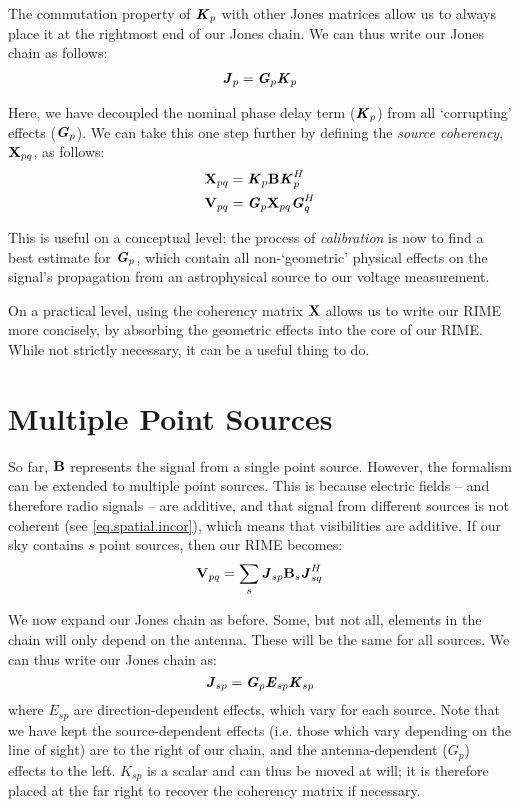 \pg
The commutation property of $\textbf{\emph{K}}_p$ with other Jones matrices allow us to always place it at the rightmost end of our Jones chain. We can thus write our Jones chain as follows:
\begin{align}
\textbf{\emph{J}}_p  &= \textbf{\emph{G}}_p \textbf{\emph{K}}_p\\
\end{align}

\pg
Here, we have decoupled the nominal phase delay term ($\textbf{\emph{K}}_p$) from all `corrupting' effects ($\textbf{\emph{G}}_p$). We can take this one step further by defining the \emph{source coherency}, $\textbf{X}_{pq}$, as follows:
\begin{align}\label{eq.def.coherency}
\textbf{X}_{pq} &= \textbf{\emph{K}}_p \textbf{B} \textbf{\emph{K}}_p^H\\
\textbf{V}_{pq} &= \textbf{\emph{G}}_p \textbf{X}_{pq} \textbf{\emph{G}}_q^H
\end{align}

\pg
This is useful on a conceptual level: the process of \emph{calibration} is now to find a best estimate for $\textbf{\emph{G}}_p$, which contain all non-`geometric' physical effects on the signal's propagation from an astrophysical source to our voltage measurement.

\pg
On a practical level, using the coherency matrix $\textbf{X}$ allows us to write our RIME more concisely, by absorbing the geometric effects into the core of our RIME. While not strictly necessary, it can be a useful thing to do.

\section{Multiple Point Sources}
\label{section.RIME.MultiplePointSources}

\pg
So far, $\textbf{B}$ represents the signal from a single point source. However, the formalism can be extended to multiple point sources. This is because electric fields -- and therefore radio signals -- are additive, and that signal from different sources is not coherent (see \cref{eq.spatial.incor}), which means that visibilities are additive. If our sky contains $s$ point sources, then our RIME becomes:
\begin{equation}
\textbf{V}_{pq} = \sum_s \textbf{\emph{J}}_{sp} \textbf{B}_s \textbf{\emph{J}}_{sq}^H
\end{equation}

\pg
We now expand our Jones chain as before. Some, but not all, elements in the chain will only depend on the antenna. These will be the same for all sources. We can thus write our Jones chain as:
\begin{equation}
\textbf{\emph{J}}_{sp} = \textbf{\emph{G}}_p \textbf{\emph{E}}_{sp} \textbf{\emph{K}}_{sp}
\end{equation}
where $E_{sp}$ are direction-dependent effects, which vary for each source. Note that we have kept the source-dependent effects (i.e. those which vary depending on the line of sight) are to the right of our chain, and the antenna-dependent ($G_p$) effects to the left. $K_{sp}$ is a scalar and can thus be moved at will; it is therefore placed at the far right to recover the coherency matrix if necessary.

